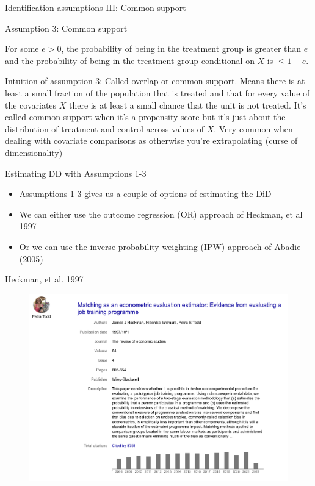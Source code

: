 \documentclass{beamer}
\begin{document}
\begin{frame}{Identification assumptions III: Common support}

Assumption 3: Common support

\bigskip

For some $e>0$, the probability of being in the treatment group is greater than $e$ and the probability of being in the treatment group conditional on $X$ is $\leq1-e$. 

\bigskip

Intuition of assumption 3: Called overlap or common support. Means there is at least a small fraction of the population that is treated and that for every value of the covariates $X$ there is at least a small chance that the unit is not treated. It's called common support when it's a propensity score but it's just about the distribution of treatment and control across values of $X$. Very common when dealing with covariate comparisons as otherwise you're extrapolating (curse of dimensionality)

\end{frame}

\begin{frame}{Estimating DD with Assumptions 1-3}

\begin{itemize}
\item Assumptions 1-3 gives us a couple of options of estimating the DiD
\item We can either use the outcome regression (OR) approach of Heckman, et al 1997
\item Or we can use the inverse probability weighting (IPW) approach of Abadie (2005)
\end{itemize}

\end{frame}


\begin{frame}{Heckman, et al. 1997}

	\begin{figure}
	\includegraphics[scale=0.35]{./lecture_includes/petra_restud_1997}
	\end{figure}

\end{frame}
\end{document}
